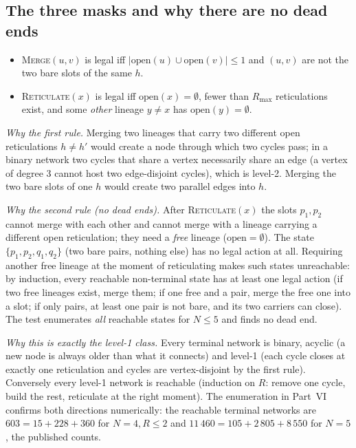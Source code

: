 \subsection{The three masks and why there are no dead ends}
\begin{keybox}
\begin{itemize}[nosep]
\item \textsc{Merge}$(u,v)$ is legal iff $|\mathrm{open}(u)\cup\mathrm{open}(v)|\le1$ and $(u,v)$ are not the two bare slots of the same $h$.
\item \textsc{Reticulate}$(x)$ is legal iff $\mathrm{open}(x)=\emptyset$, fewer than $R_{\max}$ reticulations exist, and some \emph{other} lineage $y\neq x$ has $\mathrm{open}(y)=\emptyset$.
\end{itemize}
\end{keybox}
\emph{Why the first rule.} Merging two lineages that carry two different open reticulations $h\ne h'$ would create a node through which two cycles pass; in a binary network two cycles that share a vertex necessarily share an edge (a vertex of degree 3 cannot host two edge-disjoint cycles), which is level-2. Merging the two bare slots of one $h$ would create two parallel edges into $h$.

\emph{Why the second rule (no dead ends).} After \textsc{Reticulate}$(x)$ the slots $p_1,p_2$ cannot merge with each other and cannot merge with a lineage carrying a different open reticulation; they need a \emph{free} lineage ($\mathrm{open}=\emptyset$). The state $\{p_1,p_2,q_1,q_2\}$ (two bare pairs, nothing else) has no legal action at all. Requiring another free lineage at the moment of reticulating makes such states unreachable: by induction, every reachable non-terminal state has at least one legal action (if two free lineages exist, merge them; if one free and a pair, merge the free one into a slot; if only pairs, at least one pair is not bare, and its two carriers can close). The test  enumerates \emph{all} reachable states for $N\le5$ and finds no dead end.

\emph{Why this is exactly the level-1 class.} Every terminal network is binary, acyclic (a new node is always older than what it connects) and level-1 (each cycle closes at exactly one reticulation and cycles are vertex-disjoint by the first rule). Conversely every level-1 network is reachable (induction on $R$: remove one cycle, build the rest, reticulate at the right moment). The enumeration in Part~VI confirms both directions numerically: the reachable terminal networks are $603=15+228+360$ for $N=4,R\le2$ and $11\,460=105+2\,805+8\,550$ for $N=5$, the published counts.

